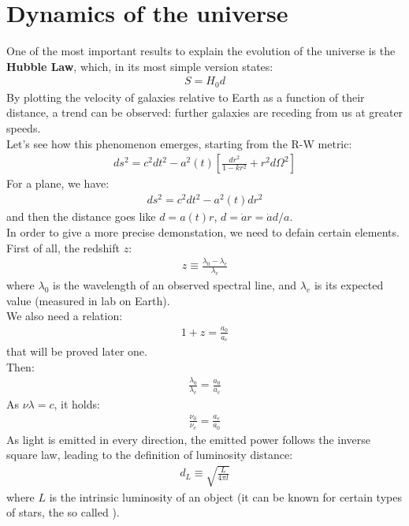 \documentclass[../PhysUniverse.tex]{subfiles}
\begin{document}
\section{Dynamics of the universe}
One of the most important results to explain the evolution of the universe is the \textbf{Hubble Law}, which, in its most simple version states:
\begin{align*}
S = H_0 d
\end{align*}
By plotting the velocity of galaxies relative to Earth as a function of their distance, a trend can be observed: further galaxies are receding from us at greater speeds.\\

Let's see how this phenomenon emerges, starting from the R-W metric:
\begin{align*}
ds^2 = c^2 dt^2 -a^2(t) \left[ \frac{dr^2}{1-kr^2} + r^2 d\Omega^2\right]
\end{align*}
For a plane, we have:
\begin{align*}
ds^2 = c^2dt^2 -a^2(t) dr^2
\end{align*}
and then the distance goes like $d=a(t)r$, $d=\dot{a}r = \dot{a}d/a$.\\

In order to give a more precise demonstation, we need to defain certain elements.\\
First of all, the redshift $z$:
\begin{align*}
z \equiv \frac{\lambda_0 - \lambda_e}{\lambda_e}
\end{align*}
where $\lambda_0$ is the wavelength of an observed spectral line, and $\lambda_e$ is its expected value (measured in lab on Earth).\\
We also need a relation:
\begin{align*}
1+ z = \frac{a_0}{a_e}
\end{align*}
that will be proved later one.\\

Then:
\begin{align*}
\frac{\lambda_0}{\lambda_e} = \frac{a_0}{a_e}
\end{align*}
As $\nu\lambda = c$, it holds:
\begin{align*}
\frac{\nu_0}{\nu_e} = \frac{a_e}{a_0}
\end{align*}
As light is emitted in every direction, the emitted power follows the inverse square law, leading to the definition of luminosity distance:
\begin{align*}
d_L \equiv \sqrt{\frac{L}{4\pi l}}
\end{align*}
where $L$ is the intrinsic luminosity of an object (it can be known for certain types of stars, the so called ).
\end{document}
